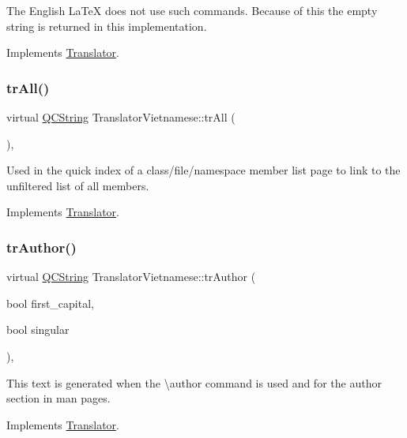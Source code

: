 The English La\+TeX does not use such commands. Because of this the empty string is returned in this implementation. 

Implements \mbox{\hyperlink{class_translator}{Translator}}.

\mbox{\label{class_translator_vietnamese_a08f55267e94ac509c8e73afa856ef8a9}} 
\subsubsection{\texorpdfstring{trAll()}{trAll()}}
{\footnotesize\ttfamily virtual \mbox{\hyperlink{class_q_c_string}{Q\+C\+String}} Translator\+Vietnamese\+::tr\+All (\begin{DoxyParamCaption}{ }\end{DoxyParamCaption})\hspace{0.3cm}{\ttfamily [inline]}, {\ttfamily [virtual]}}

Used in the quick index of a class/file/namespace member list page to link to the unfiltered list of all members. 

Implements \mbox{\hyperlink{class_translator}{Translator}}.

\mbox{\label{class_translator_vietnamese_a000e934d9b609913d306d66ee6a89359}} 
\subsubsection{\texorpdfstring{trAuthor()}{trAuthor()}}
{\footnotesize\ttfamily virtual \mbox{\hyperlink{class_q_c_string}{Q\+C\+String}} Translator\+Vietnamese\+::tr\+Author (\begin{DoxyParamCaption}\item[{bool}]{first\+\_\+capital,  }\item[{bool}]{singular }\end{DoxyParamCaption})\hspace{0.3cm}{\ttfamily [inline]}, {\ttfamily [virtual]}}

This text is generated when the \textbackslash{}author command is used and for the author section in man pages. 

Implements \mbox{\hyperlink{class_translator}{Translator}}.

